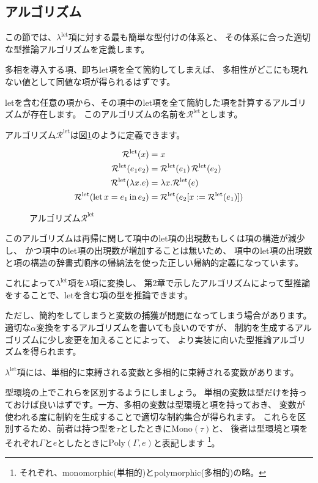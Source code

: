 \subsection{アルゴリズム}

この節では、$\lambda^\mathrm{let}$項に対する最も簡単な型付けの体系と、
その体系に合った適切な型推論アルゴリズムを定義します。

多相を導入する項、即ちlet項を全て簡約してしまえば、
多相性がどこにも現れない値として同値な項が得られるはずです。

letを含む任意の項から、その項中のlet項を全て簡約した項を計算するアルゴリズムが存在します。
このアルゴリズムの名前を$\mathcal R^\mathrm{let}$とします。

アルゴリズム$\mathcal R^\mathrm{let}$は図\ref{fig:algorithm-rlet}のように定義できます。

\begin{figure}[htbp]
  \begin{align*}
    \mathcal R^\mathrm{let}(x) &= x \\
    \mathcal R^\mathrm{let}(e_1 e_2) &=
      \mathcal R^\mathrm{let}(e_1) \, \mathcal R^\mathrm{let}(e_2) \\
    \mathcal R^\mathrm{let}(\lambda x . e) &=
      \lambda x . \mathcal R^\mathrm{let}(e) \\
    \mathcal R^\mathrm{let}(\mathrm{let} \, x = e_1 \, \mathrm{in} \, e_2) &=
      \mathcal R^\mathrm{let}(e_2 [x := \mathcal R^\mathrm{let}(e_1)])
  \end{align*}
  \caption{アルゴリズム$\mathcal R^\mathrm{let}$}
  \label{fig:algorithm-rlet}
\end{figure}

このアルゴリズムは再帰に関して項中のlet項の出現数もしくは項の構造が減少し、
かつ項中のlet項の出現数が増加することは無いため、
項中のlet項の出現数と項の構造の辞書式順序の帰納法を使った正しい帰納的定義になっています。

これによって$\lambda^\mathrm{let}$項を$\lambda$項に変換し、
第2章で示したアルゴリズムによって型推論をすることで、letを含む項の型を推論できます。

ただし、簡約をしてしまうと変数の捕獲が問題になってしまう場合があります。
適切な$\alpha$変換をするアルゴリズムを書いても良いのですが、
制約を生成するアルゴリズムに少し変更を加えることによって、
より実装に向いた型推論アルゴリズムを得られます。

$\lambda^\mathrm{let}$項には、単相的に束縛される変数と多相的に束縛される変数があります。

型環境の上でこれらを区別するようにしましょう。
単相の変数は型だけを持っておけば良いはずです。一方、多相の変数は型環境と項を持っておき、
変数が使われる度に制約を生成することで適切な制約集合が得られます。
これらを区別するため、前者は持つ型を$\tau$としたときに$\mathrm{Mono}(\tau)$と、
後者は型環境と項をそれぞれ$\Gamma$と$e$としたときに$\mathrm{Poly}(\Gamma, e)$と表記します
\footnote{それぞれ、monomorphic(単相的)とpolymorphic(多相的)の略。}。

